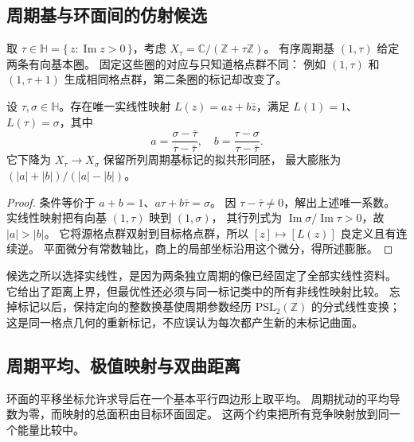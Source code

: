 \subsection{周期基与环面间的仿射候选}
\label{b3:subsec:B0503}

取 \(\tau\in\mathbb H=\{\,z:\operatorname{Im}z>0\,\}\)，考虑
\(X_\tau=\mathbb C/(\mathbb Z+\tau\mathbb Z)\)。
有序周期基 \((1,\tau)\) 给定两条有向基本圈。
固定这些圈的对应与只知道格点群不同：
例如 \((1,\tau)\) 和 \((1,\tau+1)\) 生成相同格点群，第二条圈的标记却改变了。

\begin{proposition}[环面间的仿射候选映射]\label{b3:prop:B-torus-affine}
设 \(\tau,\sigma\in\mathbb H\)。存在唯一实线性映射
\(L(z)=az+b\bar z\)，满足 \(L(1)=1\)、\(L(\tau)=\sigma\)，其中
\[
 a=\frac{\sigma-\bar\tau}{\tau-\bar\tau},\quad
 b=\frac{\tau-\sigma}{\tau-\bar\tau}.
\]
它下降为 \(X_\tau\rightarrow X_\sigma\) 保留所列周期基标记的拟共形同胚，
最大膨胀为 \((|a|+|b|)/(|a|-|b|)\)。
\end{proposition}
\begin{proof}
条件等价于 \(a+b=1\)、\(a\tau+b\bar\tau=\sigma\)。
因 \(\tau-\bar\tau\ne0\)，解出上述唯一系数。
实线性映射把有向基 \((1,\tau)\) 映到 \((1,\sigma)\)，
其行列式为 \(\operatorname{Im}\sigma/\operatorname{Im}\tau>0\)，故 \(|a|>|b|\)。
它将源格点群双射到目标格点群，所以 \([z]\mapsto[L(z)]\) 良定义且有连续逆。
平面微分有常数轴比，商上的局部坐标沿用这个微分，得所述膨胀。
\end{proof}
候选之所以选择实线性，是因为两条独立周期的像已经固定了全部实线性资料。
它给出了距离上界，但最优性还必须与同一标记类中的所有非线性映射比较。
忘掉标记以后，保持定向的整数换基使周期参数经历
\(\mathrm{PSL}_2(\mathbb Z)\) 的分式线性变换；
这是同一格点几何的重新标记，不应误认为每次都产生新的未标记曲面。

\subsection{周期平均、极值映射与双曲距离}
\label{b3:subsec:B0504}

环面的平移坐标允许求导后在一个基本平行四边形上取平均。
周期扰动的平均导数为零，而映射的总面积由目标环面固定。
这两个约束把所有竞争映射放到同一个能量比较中。

